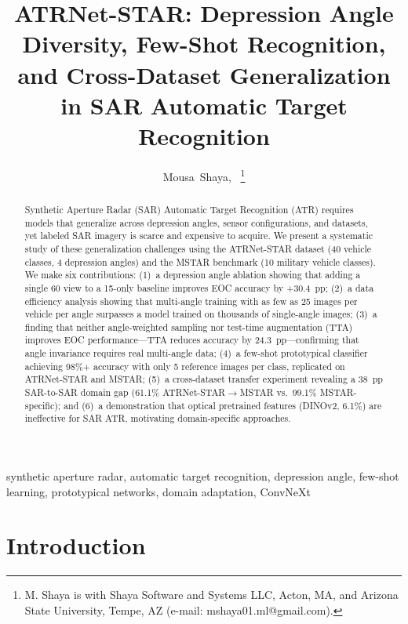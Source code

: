 \documentclass[journal]{IEEEtran}
\begin{document}
\title{ATRNet-STAR: Depression Angle Diversity, Few-Shot Recognition,
and Cross-Dataset Generalization in SAR Automatic Target Recognition}

\author{Mousa~Shaya,~\IEEEmembership{}
\thanks{M. Shaya is with Shaya Software and Systems LLC, Acton, MA, and
Arizona State University, Tempe, AZ (e-mail: mshaya01.ml@gmail.com).}}

\maketitle

\begin{abstract}
Synthetic Aperture Radar (SAR) Automatic Target Recognition (ATR) requires
models that generalize across depression angles, sensor configurations, and
datasets, yet labeled SAR imagery is scarce and expensive to acquire. We
present a systematic study of these generalization challenges using the
ATRNet-STAR dataset (40 vehicle classes, 4 depression angles) and the MSTAR
benchmark (10 military vehicle classes). We make six contributions:
(1)~a depression angle ablation showing that adding a single 60\textdegree{}
view to a 15\textdegree{}-only baseline improves EOC accuracy by +30.4~pp;
(2)~a data efficiency analysis showing that multi-angle training with as few
as 25 images per vehicle per angle surpasses a model trained on thousands of
single-angle images; (3)~a finding that neither angle-weighted sampling nor
test-time augmentation (TTA) improves EOC performance---TTA reduces accuracy
by 24.3~pp---confirming that angle invariance requires real multi-angle data;
(4)~a few-shot prototypical classifier achieving 98\%+ accuracy with only 5
reference images per class, replicated on ATRNet-STAR and MSTAR; (5)~a
cross-dataset transfer experiment revealing a 38~pp SAR-to-SAR domain gap
(61.1\% ATRNet-STAR$\to$MSTAR vs.\ 99.1\% MSTAR-specific); and (6)~a
demonstration that optical pretrained features (DINOv2, 6.1\%) are
ineffective for SAR ATR, motivating domain-specific approaches.
\end{abstract}

\begin{IEEEkeywords}
synthetic aperture radar, automatic target recognition, depression angle,
few-shot learning, prototypical networks, domain adaptation, ConvNeXt
\end{IEEEkeywords}

\section{Introduction}
\end{document}
